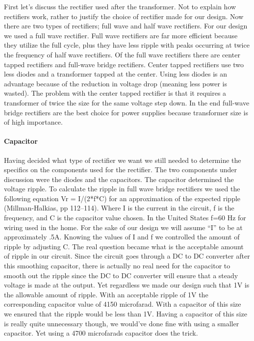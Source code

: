 First let{}'s discuss the rectifier used after the transformer. Not to explain
how rectifiers work, rather to justify the choice of rectifier made for our
design. Now there are two types of rectifiers; full wave and half wave
rectifiers.  For our design we used a full wave rectifier. Full wave
rectifiers are far more efficient because they utilize the full cycle, plus
they have less ripple with peaks occurring at twice the frequency of half wave
rectifiers. Of the full wave rectifiers there are center tapped rectifiers and
full{}-wave bridge rectifiers. Center tapped rectifiers use two less diodes and
a transformer tapped at the center. Using less diodes is an advantage because
of the reduction in voltage drop (meaning less power is wasted). The problem
with the center tapped rectifier is that it requires a transformer of twice the
size for the same voltage step down. In the end full{}-wave bridge rectifiers
are the best choice for power supplies because transformer size is of high
importance.

\paragraph{Capacitor}

Having decided what type of rectifier we want we still needed to determine the
specifics on the components used for the rectifier. The two components under
discussion were the diodes and the capacitors. The capacitor determined the
voltage ripple. To calculate the ripple in full wave bridge rectifiers we used
the following equation Vr = I/(2*f*C) for an approximation of the expected
ripple (Millman{}-Halkias, pp 112--114). Where I is the current in the circuit,
f is the frequency, and C is the capacitor value chosen. In the United States
f=60 Hz for wiring used in the home. For the sake of our design we will assume
{}``I{}'' to be at approximately .5A. Knowing the values of I and f we
controlled the amount of ripple by adjusting C. The real question became what
is the acceptable amount of ripple in our circuit. Since the circuit goes through a DC to DC converter after this smoothing capacitor, there is actually
no real need for the capacitor to smooth out the ripple since the DC to DC
converter will ensure that a steady voltage is made at the output. Yet
regardless we made our design such that 1V is the allowable amount of
ripple. With an acceptable ripple of 1V the corresponding capacitor value of
4150 microfarad. With a capacitor of this size we ensured that
the ripple would be less than 1V. Having a capacitor of this size is really
quite unnecessary though, we would{}'ve done fine with using a smaller
capacitor. Yet using a 4700 microfarads capacitor does the trick.

